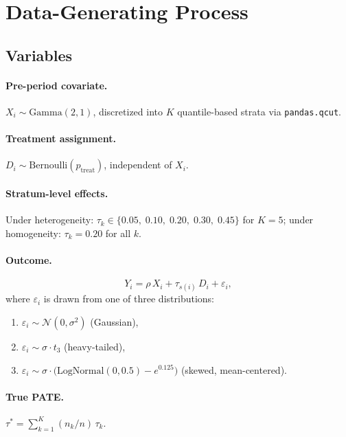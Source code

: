 \documentclass[11pt,letterpaper]{article}
\newcommand{\taustar}{\tau^{*}}
\begin{document}
\section{Data-Generating Process}\label{sec:dgp}

\subsection{Variables}

\paragraph{Pre-period covariate.}
$X_i \sim \text{Gamma}(2, 1)$, discretized into $K$ quantile-based
strata via \texttt{pandas.qcut}.

\paragraph{Treatment assignment.}
$D_i \sim \text{Bernoulli}(p_{\text{treat}})$, independent of $X_i$.

\paragraph{Stratum-level effects.}
Under heterogeneity: $\tau_k \in \{0.05,\; 0.10,\; 0.20,\; 0.30,\; 0.45\}$
for $K=5$; under homogeneity: $\tau_k = 0.20$ for all $k$.

\paragraph{Outcome.}
\[
  Y_i = \rho\, X_i + \tau_{s(i)}\, D_i + \varepsilon_i,
\]
where $\varepsilon_i$ is drawn from one of three distributions:
\begin{enumerate}
  \item $\varepsilon_i \sim \mathcal{N}(0, \sigma^2)$ \quad (Gaussian),
  \item $\varepsilon_i \sim \sigma \cdot t_3$ \quad (heavy-tailed),
  \item $\varepsilon_i \sim \sigma \cdot \bigl(\text{LogNormal}(0, 0.5)
        - e^{0.125}\bigr)$ \quad (skewed, mean-centered).
\end{enumerate}

\paragraph{True PATE.}
$\taustar = \sum_{k=1}^{K} (n_k/n)\, \tau_k$.
\end{document}
